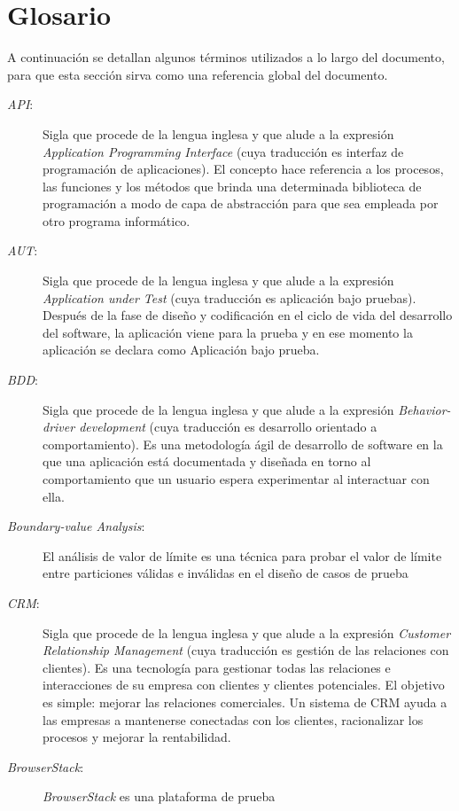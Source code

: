 \chapter{Glosario}
\label{appendix_glossary}
A continuación se detallan algunos términos utilizados a lo largo del
documento, para que esta sección sirva como una referencia global del documento.

\begin{description}
\item [\emph{API}:] Sigla que procede de la lengua inglesa y que alude a la
    expresión \emph{Application Programming Interface} (cuya traducción es
    interfaz de programación de aplicaciones). El concepto hace referencia a los
    procesos, las funciones y los métodos que brinda una determinada biblioteca
    de programación a modo de capa de abstracción para que sea empleada por otro
    programa informático.
\item [\emph{AUT}:] Sigla que procede de la lengua inglesa y que alude a la
    expresión \emph{Application under Test} (cuya traducción es aplicación bajo
    pruebas). Después de la fase de diseño y codificación en el ciclo de vida
    del desarrollo del software, la aplicación viene para la prueba y en ese
    momento la aplicación se declara como Aplicación bajo prueba.
\item [\emph{BDD}:] Sigla que procede de la lengua inglesa y que alude a la
    expresión \emph{Behavior-driver development} (cuya traducción es desarrollo
    orientado a comportamiento). Es una metodología ágil de desarrollo de
    software en la que una aplicación está documentada y diseñada en torno al
    comportamiento que un usuario espera experimentar al interactuar con ella.
\item [\emph{Boundary-value Analysis}:] El análisis de valor de límite es una
    técnica para probar el valor de límite entre particiones válidas e inválidas
    en el diseño de casos de prueba
\item [\emph{CRM}:] Sigla que procede de la lengua inglesa y que alude a la
    expresión \emph{Customer Relationship Management} (cuya traducción es
    gestión de las relaciones con clientes). Es una tecnología para gestionar
    todas las relaciones e interacciones de su empresa con clientes y clientes
    potenciales. El objetivo es simple: mejorar las relaciones comerciales. Un
    sistema de CRM ayuda a las empresas a mantenerse conectadas con los
    clientes, racionalizar los procesos y mejorar la rentabilidad.
\item [\emph{BrowserStack}:] \emph{BrowserStack} es una plataforma de prueba

\end{description}
